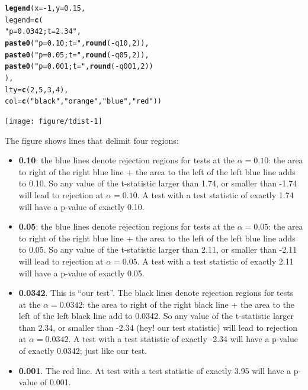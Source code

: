 \documentclass[a4paper,11pt]{article}\usepackage[]{graphicx}\usepackage[]{xcolor}
\makeatletter
\newcommand{\hlnum}[1]{\textcolor[rgb]{0.686,0.059,0.569}{#1}}%
\newcommand{\hlsng}[1]{\textcolor[rgb]{0.192,0.494,0.8}{#1}}%
\newcommand{\hlopt}[1]{\textcolor[rgb]{0,0,0}{#1}}%
\newcommand{\hldef}[1]{\textcolor[rgb]{0.345,0.345,0.345}{#1}}%
\newcommand{\hlkwc}[1]{\textcolor[rgb]{0.333,0.667,0.333}{#1}}%
\newcommand{\hlkwd}[1]{\textcolor[rgb]{0.737,0.353,0.396}{\textbf{#1}}}%
\newenvironment{kframe}{%
 \def\at@end@of@kframe{}%
 \ifinner\ifhmode%
  \def\at@end@of@kframe{\end{minipage}}%
  \begin{minipage}{\columnwidth}%
 \fi\fi%
 \def\FrameCommand##1{\hskip\@totalleftmargin \hskip-\fboxsep
 \colorbox{shadecolor}{##1}\hskip-\fboxsep
     \hskip-\linewidth \hskip-\@totalleftmargin \hskip\columnwidth}%
 \MakeFramed {\advance\hsize-\width
   \@totalleftmargin\z@ \linewidth\hsize
   \@setminipage}}%
 {\par\unskip\endMakeFramed%
 \at@end@of@kframe}
\newenvironment{knitrout}{}{} %
\numberwithin{exercise}{section}
\makeatother
\begin{document}
\begin{knitrout}
\begin{kframe}
\begin{alltt}
\hlkwd{legend}\hldef{(}\hlkwc{x} \hldef{=} \hlopt{-}\hlnum{1}\hldef{,} \hlkwc{y} \hldef{=} \hlnum{0.15}\hldef{,}
       \hlkwc{legend} \hldef{=} \hlkwd{c}\hldef{(}
         \hlsng{"p = 0.0342; t = 2.34"}\hldef{,}
         \hlkwd{paste0}\hldef{(}\hlsng{"p = 0.10; t = "}\hldef{,} \hlkwd{round}\hldef{(}\hlopt{-}\hldef{q10,} \hlnum{2}\hldef{)),}
         \hlkwd{paste0}\hldef{(}\hlsng{"p = 0.05; t = "}\hldef{,} \hlkwd{round}\hldef{(}\hlopt{-}\hldef{q05,} \hlnum{2}\hldef{)),}
         \hlkwd{paste0}\hldef{(}\hlsng{"p = 0.001; t = "}\hldef{,} \hlkwd{round}\hldef{(}\hlopt{-}\hldef{q001,} \hlnum{2}\hldef{))}
       \hldef{),}
       \hlkwc{lty} \hldef{=} \hlkwd{c}\hldef{(}\hlnum{2}\hldef{,} \hlnum{5}\hldef{,} \hlnum{3}\hldef{,} \hlnum{4}\hldef{),}
       \hlkwc{col} \hldef{=} \hlkwd{c}\hldef{(}\hlsng{"black"}\hldef{,} \hlsng{"orange"}\hldef{,} \hlsng{"blue"}\hldef{,} \hlsng{"red"}\hldef{))}
\end{alltt}
\end{kframe}
\texttt{[image: figure/tdist-1]} 
\end{knitrout}

The figure shows lines that delimit four regions:

\begin{itemize}

\item \textbf{0.10}: the blue lines denote rejection regions for tests at the \(\alpha = 0.10\): the area to right of the right blue line + the area to the left of the left blue line adds to 0.10. So any value of the t-statistic larger than 1.74, or smaller than -1.74 will lead to rejection at \(\alpha = 0.10\).  A test with a test statistic of exactly 1.74 will have a p-value of exactly 0.10.


\item \textbf{0.05}: the blue lines denote rejection regions for tests at the \(\alpha = 0.05\): the area to right of the right blue line + the area to the left of the left blue line adds to 0.05. So any value of the t-statistic larger than 2.11, or smaller than -2.11 will lead to rejection at \(\alpha = 0.05\).  A test with a test statistic of exactly 2.11 will have a p-value of exactly 0.05.


\item \textbf{0.0342}. This is ``our test''.  The black lines denote rejection regions for tests at the \(\alpha = 0.0342\): the area to right of the right black line + the area to the left of the left black line add to 0.0342. So any value of the t-statistic larger than 2.34, or smaller than -2.34 (hey! our test statistic) will lead to rejection at \(\alpha = 0.0342\).  A test with a test statistic of exactly -2.34 will have a p-value of exactly 0.0342; just like our test.


\item \textbf{0.001}. The red line. At test with a test statistic of exactly 3.95 will have a p-value of 0.001.

\end{itemize}
\end{document}
